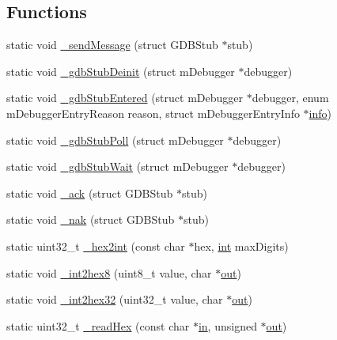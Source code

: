 \subsection*{Functions}
\begin{DoxyCompactItemize}
\item 
static void \mbox{\hyperlink{gdb-stub_8c_abb9ab714ec89c5c39435215b2f48517c}{\+\_\+send\+Message}} (struct G\+D\+B\+Stub $\ast$stub)
\item 
static void \mbox{\hyperlink{gdb-stub_8c_aff57f00e254220e5733ab7a534ab526c}{\+\_\+gdb\+Stub\+Deinit}} (struct m\+Debugger $\ast$debugger)
\item 
static void \mbox{\hyperlink{gdb-stub_8c_a409655c77fda26ad161b9097e7d4130e}{\+\_\+gdb\+Stub\+Entered}} (struct m\+Debugger $\ast$debugger, enum m\+Debugger\+Entry\+Reason reason, struct m\+Debugger\+Entry\+Info $\ast$\mbox{\hyperlink{libretro_8h_a283ad41e4809f9c0ebe736a9861d8a91}{info}})
\item 
static void \mbox{\hyperlink{gdb-stub_8c_ae58295c549402f4ef20ff8aad2c5dfeb}{\+\_\+gdb\+Stub\+Poll}} (struct m\+Debugger $\ast$debugger)
\item 
static void \mbox{\hyperlink{gdb-stub_8c_a611cb8cc4b4a1b0885f3d3a45487045b}{\+\_\+gdb\+Stub\+Wait}} (struct m\+Debugger $\ast$debugger)
\item 
static void \mbox{\hyperlink{gdb-stub_8c_abfab9a55492e6a7fc7ca801619550fb0}{\+\_\+ack}} (struct G\+D\+B\+Stub $\ast$stub)
\item 
static void \mbox{\hyperlink{gdb-stub_8c_a36136f8c4944f09ed1670d80a19fa31a}{\+\_\+nak}} (struct G\+D\+B\+Stub $\ast$stub)
\item 
static uint32\+\_\+t \mbox{\hyperlink{gdb-stub_8c_acc566acd6b2a0d699a29fc52811d345e}{\+\_\+hex2int}} (const char $\ast$hex, \mbox{\hyperlink{ioapi_8h_a787fa3cf048117ba7123753c1e74fcd6}{int}} max\+Digits)
\item 
static void \mbox{\hyperlink{gdb-stub_8c_ad3195dd3a3a4e1fcdb8368c6c8372a08}{\+\_\+int2hex8}} (uint8\+\_\+t value, char $\ast$\mbox{\hyperlink{gun_8c_acb2d4658684492100bc328998f52ae82}{out}})
\item 
static void \mbox{\hyperlink{gdb-stub_8c_a77ffa276051d098347aadf57d3a8e245}{\+\_\+int2hex32}} (uint32\+\_\+t value, char $\ast$\mbox{\hyperlink{gun_8c_acb2d4658684492100bc328998f52ae82}{out}})
\item 
static uint32\+\_\+t \mbox{\hyperlink{gdb-stub_8c_a480f57f311cfc4a8cd9182b20ca8addc}{\+\_\+read\+Hex}} (const char $\ast$\mbox{\hyperlink{gun_8c_a8bab68b4d22f69428207fabb60dc4f5c}{in}}, unsigned $\ast$\mbox{\hyperlink{gun_8c_acb2d4658684492100bc328998f52ae82}{out}})

\end{DoxyCompactItemize}
